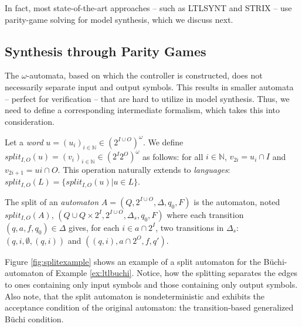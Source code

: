 In fact, most state-of-the-art approaches -- such as LTLSYNT \cite{ltlsynt} and STRIX \cite{strix} -- use parity-game solving for model synthesis, which we discuss next.

\subsection{Synthesis through Parity Games}

The $\omega$-automata, based on which the controller is constructed, does not necessarily separate input and output symbols. This results in smaller automata -- perfect for verification -- that are hard to utilize in model synthesis. Thus, we need to define a corresponding intermediate formalism, which takes this into consideration.

\begin{definition} 
Let a \textit{word} $u = (u_i)_{i \in \mathbb{N}} \in (2^{I \cup O})^\omega$. We define $split_{I,O}(u) = (v_i)_{i \in \mathbb{N}} \in (2^I 2^O)^\omega$ as follows: for all $i \in \mathbb{N}$, $v_{2i} = u_i \cap I$ and $v_{2i+1} = ui \cap O$. This operation naturally extends to \textit{languages}: $split_{I,O}(L) = \{split_{I,O}(u) | u \in L \}$.

The split of an \textit{automaton} $A = (Q,2^{I \cup O}, \Delta, q_0, F)$ is the automaton, noted $split_{I,O}(A)$, $(Q \cup Q \times 2^I, 2^{I \cup O},\Delta_s,q_0,F)$ where each transition $(q,a,f,q_0) \in \Delta$ gives, for each $i \in a \cap 2^I$, two transitions in $\Delta_s$: $(q,i,\emptyset,(q,i))$ and $((q,i),a \cap 2^O,f,q')$.
\end{definition}

\begin{example}
	\label{ex:splitexample}
	Figure \ref{fig:splitexample} shows an example of a split automaton for the Büchi-automaton of Example \ref{ex:ltlbuchi}. Notice, how the splitting separates the edges to ones containing only input symbols and those containing only output symbols. Also note, that the split automaton is nondeterministic and exhibits the acceptance condition of the original automaton: the transition-based generalized Büchi condition.
\end{example}

